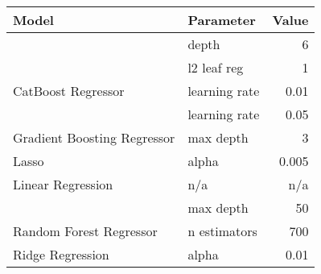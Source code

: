 
\begin{tabular}[t]{llr}
\toprule
\multicolumn{1}{l}{Model} & \multicolumn{1}{l}{Parameter} & \multicolumn{1}{l}{Value}\\
\midrule
 & depth & 6\\

 & l2 leaf reg & 1\\

\multirow[t]{-3}{*}{\raggedright\arraybackslash CatBoost Regressor} & learning rate & 0.01\\
\cmidrule(lr){1-3}

 & learning rate & 0.05\\

\multirow[t]{-2}{*}{\raggedright\arraybackslash Gradient Boosting Regressor} & max depth & 3\\
\cmidrule(lr){1-3}

Lasso & alpha & 0.005\\
\cmidrule(lr){1-3}

Linear Regression & n/a & n/a\\
\cmidrule(lr){1-3}

 & max depth & 50\\

\multirow[t]{-2}{*}{\raggedright\arraybackslash Random Forest Regressor} & n estimators & 700\\
\cmidrule(lr){1-3}

Ridge Regression & alpha & 0.01\\
\bottomrule
\end{tabular}
